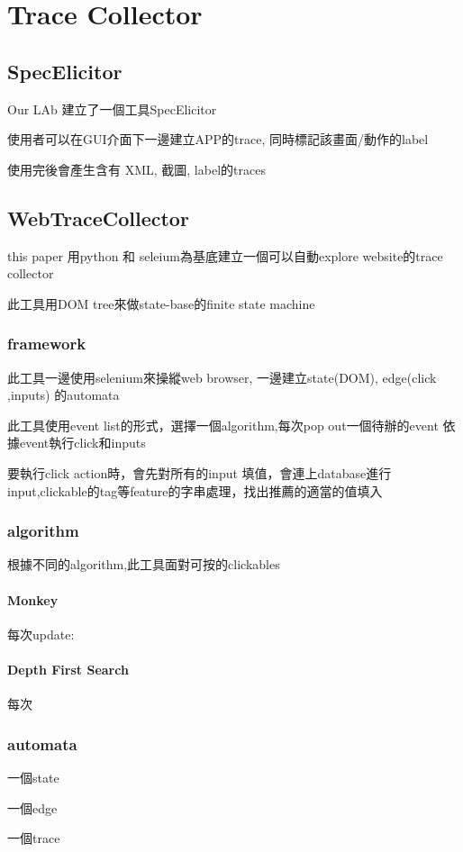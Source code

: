 
\chapter{Trace Collector}\label{ch:traceCollector}

\section{SpecElicitor}

Our LAb 建立了一個工具SpecElicitor

使用者可以在GUI介面下一邊建立APP的trace, 同時標記該畫面/動作的label

使用完後會產生含有 XML, 截圖, label的traces

\section{WebTraceCollector}

this paper 用python 和 seleium為基底建立一個可以自動explore website的trace collector

此工具用DOM tree來做state-base的finite state machine

\subsection{framework}

此工具一邊使用selenium來操縱web browser,
一邊建立state(DOM), edge(click ,inputs) 的automata

此工具使用event list的形式，選擇一個algorithm,每次pop out一個待辦的event
依據event執行click和inputs

要執行click action時，會先對所有的input 填值，會連上database進行input,clickable的tag等feature的字串處理，找出推薦的適當的值填入


\subsection{algorithm}

根據不同的algorithm,此工具面對可按的clickables

\subsubsection{Monkey}

每次update:

\subsubsection{Depth First Search}

每次

\subsection{automata}

一個state

一個edge

一個trace

